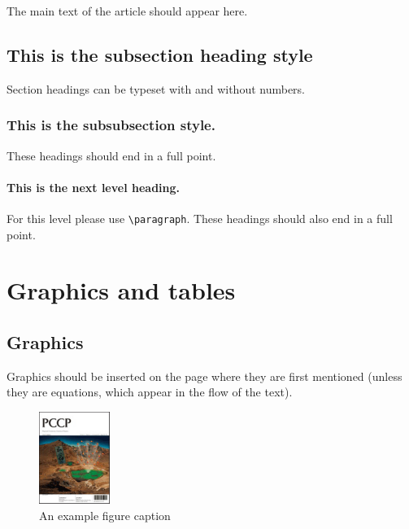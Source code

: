 \documentclass[twoside,twocolumn,9pt]{article}
\begin{document}



The main text of the article\cite{Mena2000} should appear here.

\subsection{This is the subsection heading style}
Section headings can be typeset with and without numbers.\cite{Abernethy2003}

\subsubsection{This is the subsubsection style.~~} These headings should end in a full point.  

\paragraph{This is the next level heading.~~} For this level please use \texttt{\textbackslash paragraph}. These headings should also end in a full point.

\section{Graphics and tables}
\subsection{Graphics}
Graphics should be inserted on the page where they are first mentioned (unless they are equations, which appear in the flow of the text).\cite{Cotton1999}

\begin{figure}[h]
\centering
  \includegraphics[height=3cm]{1}
  \caption{An example figure caption}
  \label{fgr:example}
\end{figure}
\end{document}
